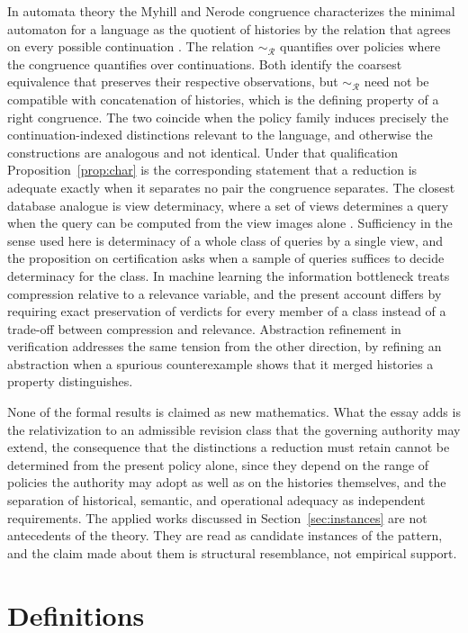 \documentclass[11pt]{article}
\theoremstyle{remark}
\newcommand{\Rev}{\mathcal{R}}
\begin{document}
In automata theory the Myhill and Nerode congruence characterizes the minimal automaton for a language as the quotient of histories by the relation that agrees on every possible continuation \cite{nerode1958}. The relation $\sim_{\Rev}$ quantifies over policies where the congruence quantifies over continuations. Both identify the coarsest equivalence that preserves their respective observations, but $\sim_{\Rev}$ need not be compatible with concatenation of histories, which is the defining property of a right congruence. The two coincide when the policy family induces precisely the continuation-indexed distinctions relevant to the language, and otherwise the constructions are analogous and not identical. Under that qualification Proposition~\ref{prop:char} is the corresponding statement that a reduction is adequate exactly when it separates no pair the congruence separates. The closest database analogue is view determinacy, where a set of views determines a query when the query can be computed from the view images alone \cite{nash2010}. Sufficiency in the sense used here is determinacy of a whole class of queries by a single view, and the proposition on certification asks when a sample of queries suffices to decide determinacy for the class. In machine learning the information bottleneck \cite{tishby1999} treats compression relative to a relevance variable, and the present account differs by requiring exact preservation of verdicts for every member of a class instead of a trade-off between compression and relevance. Abstraction refinement in verification \cite{clarke2000} addresses the same tension from the other direction, by refining an abstraction when a spurious counterexample shows that it merged histories a property distinguishes.

None of the formal results is claimed as new mathematics. What the essay adds is the relativization to an admissible revision class that the governing authority may extend, the consequence that the distinctions a reduction must retain cannot be determined from the present policy alone, since they depend on the range of policies the authority may adopt as well as on the histories themselves, and the separation of historical, semantic, and operational adequacy as independent requirements. The applied works discussed in Section~\ref{sec:instances} are not antecedents of the theory. They are read as candidate instances of the pattern, and the claim made about them is structural resemblance, not empirical support.

\section{Definitions}\label{sec:defs}
\end{document}
